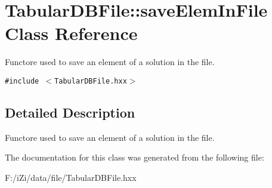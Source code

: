 \section{Tabular\-DBFile::save\-Elem\-In\-File Class Reference}
\label{class_tabular_d_b_file_1_1save_elem_in_file}
Functore used to save an element of a solution in the file.  


{\tt \#include $<$Tabular\-DBFile.hxx$>$}



\subsection{Detailed Description}
Functore used to save an element of a solution in the file. 



The documentation for this class was generated from the following file:\begin{CompactItemize}
\item 
F:/i\-Zi/data/file/Tabular\-DBFile.hxx\end{CompactItemize}
